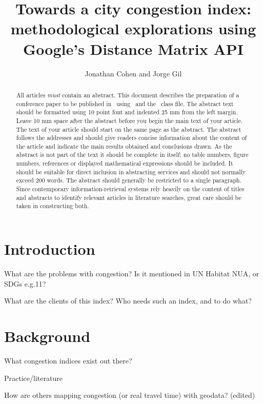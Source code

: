 \documentclass[a4paper]{jpconf}
\begin{document}
\title{Towards a city congestion index: methodological explorations using Google's Distance Matrix API}

\author{Jonathan Cohen and Jorge Gil}

\address{Chalmers University of Technology, Sven Hultins gata 6, SE-412 96, Göteborg, Sweden}





\begin{abstract}
	All articles {\it must} contain an abstract. This document describes the  preparation of a conference paper to be published in \jpcs\ using \LaTeXe\ and the \cls\ class file. The abstract text should be formatted using 10 point font and indented 25 mm from the left margin. Leave 10 mm space after the abstract before you begin the main text of your article. The text of your article should start on the same page as the abstract. The abstract follows the addresses and should give readers concise information about the content of the article and indicate the main results obtained and conclusions drawn. As the abstract is not part of the text it should be complete in itself; no table numbers, figure numbers, references or displayed mathematical expressions should be included. It should be suitable for direct inclusion in abstracting services and should not normally exceed 200 words. The abstract should generally be restricted to a single paragraph. Since contemporary information-retrieval systems rely heavily on the content of titles and abstracts to identify relevant articles in literature searches, great care should be taken in constructing both.
\end{abstract}




\section{Introduction}
\indent What are the problems with congestion? Is it mentioned in UN Habitat NUA, or SDGs e.g.11?\par
\indent What are the clients of this index? Who needs such an index, and to do what?\par

\section{Background}
\indent What congestion indices exist out there? \par
\indent Practice/literature\par
\indent How are others mapping congestion (or real travel time) with geodata? (edited) \par
\end{document}
